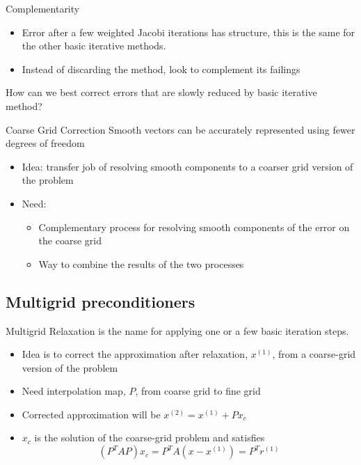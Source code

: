\begin{frame}{Complementarity}
  \begin{itemize}
  \item  Error after a few weighted Jacobi iterations has structure,
this is the same for the other basic iterative methods.
\item Instead of discarding the method, look to complement its
failings

  \end{itemize}
How can we best correct errors that are slowly reduced by basic
iterative method?
\end{frame}


\begin{frame}{Coarse Grid Correction}
  Smooth vectors can be accurately represented using fewer
  degrees of freedom
  \begin{itemize}
  \item Idea: transfer job of resolving smooth components to a
coarser grid version of the problem
\item Need:
  \begin{itemize}
    \item Complementary process for resolving smooth
components of the error on the coarse grid
\item Way to combine the results of the two processes

  \end{itemize}

  \end{itemize}
\end{frame}
\subsection{Multigrid preconditioners}
\begin{frame}{Multigrid}
  Relaxation is the name for applying one or a few basic
  iteration steps.
  \begin{itemize}
  \item Idea is to correct the approximation after relaxation, $x^{(1)}$,
from a coarse-grid version of the problem
\item Need interpolation map, $P$, from coarse grid to fine grid
\item Corrected approximation will be $x^{(2)} = x^{(1)} + Px_c$
\item $x_c$ is the solution of the coarse-grid problem and satisfies
  \begin{equation*}
    (P^T A P)x_c = P^T A(x - x^{(1)}) = P^T r^{(1)}
  \end{equation*}


  \end{itemize}
\end{frame}

